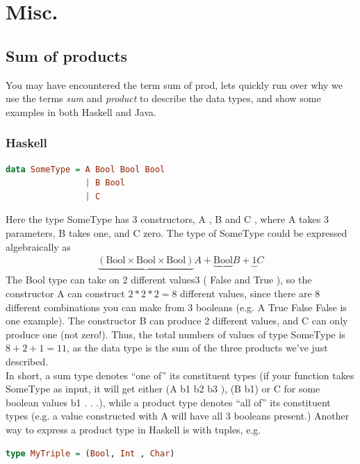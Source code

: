 \documentclass{article}
\begin{document}
    \section{Misc.}
        \subsection{Sum of products}
            You may have encountered the term \gls{sum of prod}, lets quickly run over why we use the terms \textit{sum} and \textit{product} 
            to describe the data types, and show some examples in both Haskell and Java.
            \subsubsection*{Haskell}
            \begin{lstlisting}[language=Haskell]
data SomeType = A Bool Bool Bool
                | B Bool
                | C
            \end{lstlisting}
            Here the type SomeType has 3 constructors, A , B and C , where A takes 3 parameters, B takes one, and C zero. 
            The type of SomeType could be expressed algebraically as
            \begin{align*}
                \underbrace{(\text{Bool} \times \text{Bool} \times \text{Bool})}{A} + \underbrace{\text{Bool}}{B} + \underbrace{1}{C}
            \end{align*}
            The Bool type can take on 2 different values3
            ( False and True ), so the constructor A
            can construct $2 * 2 * 2 = 8$ different values, since there are 8 different combinations you can
            make from 3 booleans (e.g. A True False False is one example). The constructor B can
            produce 2 different values, and C can only produce one (not zero!).
            Thus, the total numbers of values of type SomeType is $8 + 2 + 1 = 11$, as the data type
            is the sum of the three products we've just described.\\
            In short, a sum type denotes “one of” its constituent types (if your function takes SomeType
            as input, it will get either (A b1 b2 b3 ), (B b1) or C for some boolean values b1 . . .), while
            a product type denotes “all of” its constituent types (e.g. a value constructed with A will
            have all 3 booleans present.) Another way to express a product type in Haskell is with tuples,
            e.g.
            \begin{lstlisting}[language=Haskell]
type MyTriple = (Bool, Int , Char)
            \end{lstlisting}
\end{document}
